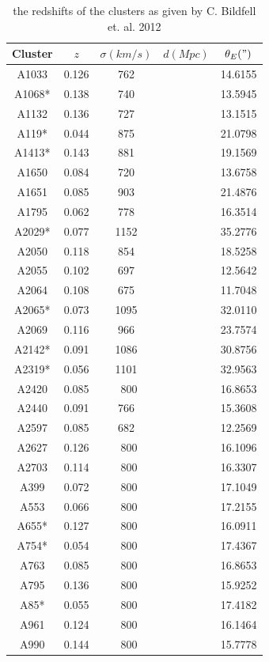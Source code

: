 \begin{table}[]
\centering

\begin{tabular}{ccccc}
Cluster & $z$   & $\sigma(km/s)$ & $d(Mpc)$ & $\theta_{E}(")$ \\ \hline \hline
A1033   & 0.126 & 762            &  & 14.6155  \\
A1068*  & 0.138 & 740            &  & 13.5945  \\
A1132   & 0.136 & 727            &  & 13.1515   \\
A119*   & 0.044 & 875            &  & 21.0798   \\
A1413*  & 0.143 & 881            &  & 19.1569   \\
A1650   & 0.084 & 720            &  & 13.6758   \\
A1651   & 0.085 & 903            &  & 21.4876   \\
A1795   & 0.062 & 778            &  & 16.3514   \\
A2029*  & 0.077 & 1152           &  & 35.2776   \\
A2050   & 0.118 & 854            &  & 18.5258   \\
A2055   & 0.102 & 697            &  & 12.5642   \\
A2064   & 0.108 & 675            &  & 11.7048   \\
A2065*  & 0.073 & 1095           &  & 32.0110   \\
A2069   & 0.116 & 966            &  & 23.7574   \\
A2142*  & 0.091 & 1086           &  & 30.8756   \\
A2319*  & 0.056 & 1101           &  & 32.9563   \\
A2420   & 0.085 & ~800           &  & 16.8653   \\
A2440   & 0.091 & 766            &  & 15.3608   \\
A2597   & 0.085 & 682            &  & 12.2569   \\
A2627   & 0.126 & ~800           &  & 16.1096   \\
A2703   & 0.114 & ~800           &  & 16.3307   \\
A399    & 0.072 & ~800           &  & 17.1049   \\
A553    & 0.066 & ~800           &  & 17.2155   \\
A655*   & 0.127 & ~800           &  & 16.0911   \\
A754*   & 0.054 & ~800           &  & 17.4367   \\
A763    & 0.085 & ~800           &  & 16.8653   \\
A795    & 0.136 & ~800           &  & 15.9252   \\
A85*    & 0.055 & ~800           &  & 17.4182   \\
A961    & 0.124 & ~800           &  & 16.1464   \\
A990    & 0.144 & ~800           &  & 15.7778   
\end{tabular}
\caption{the redshifts of the clusters as given by C. Bildfell et. al. 2012 }
\label{my-label}
\end{table}

